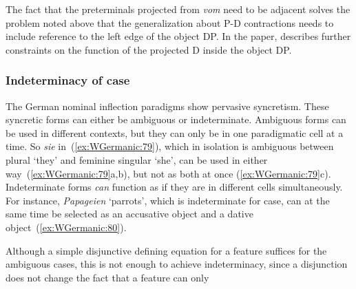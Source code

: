 \documentclass[output=paper,hidelinks]{langscibook}
\begin{document}
%
The fact that the preterminals projected from \textit{vom} need to be
adjacent solves the problem noted above that the generalization about
P-D contractions needs to include reference to the left edge of the
object DP. In the paper, \citeauthor{wescoat2007} describes
further constraints on the function of the projected D inside the
object DP.

\subsubsection{Indeterminacy of case\label{sec:Germanic:indeterminacy}}
\largerpage
The German nominal inflection paradigms show pervasive
syncretism. These syncretic forms can either be ambiguous or
indeterminate. Ambiguous forms can be used in different contexts, but
they can only be in one paradigmatic cell at a time. So \textit{sie}
in~(\ref{ex:WGermanic:79}), which in isolation is ambiguous between plural `they'
and feminine singular `she', can be used in either way~(\ref{ex:WGermanic:79}a,b), but not as both at once (\ref{ex:WGermanic:79}c). Indeterminate forms \textit{can}
function as if they are in different cells simultaneously. For
instance, \textit{Papageien} `parrots', which is indeterminate for
case, can at the same time be selected as an accusative object and a
dative object~(\ref{ex:WGermanic:80}).
%
\begin{exe}
  \ex\label{ex:WGermanic:79}
  \begin{xlist}
  \end{xlist}
  \ex\label{ex:WGermanic:80}
  \begin{xlist}
  \end{xlist}
\end{exe}
%
Although a simple disjunctive defining equation for a feature suffices
for the ambiguous cases, this is not enough to achieve indeterminacy,
since a disjunction does not change the fact that a feature can only
\end{document}
